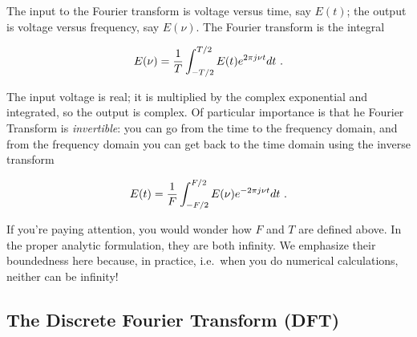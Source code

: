 \documentclass[11pt,preprint]{aastex}
\begin{document}
        The input to the Fourier transform is voltage versus time, say
$E(t)$; the output is voltage versus frequency, say $E(\nu)$.  The Fourier
transform is the integral
 
\begin{equation} \label{ift}
E(\nu) = {1 \over T} \int_{-T/2}^{T/2} E(t) e^{2 \pi j \nu t} dt \ .
\end{equation}
 
\noindent The input voltage is real; it is multiplied by the complex
exponential and integrated, so the output is complex. Of particular
importance is that he Fourier Transform is {\it invertible}: you can go
from the time to the frequency domain, and from the frequency domain you can
get back to the time domain using the inverse transform

\begin{equation}
E(t) = {1 \over F} \int_{-F/2}^{F/2} E(\nu) e^{-2 \pi j \nu t} dt \ .
\end{equation}
 
 If you're paying attention, you would wonder how
$F$ and $T$ are defined above. In the proper analytic formulation, they
are both infinity. We emphasize their boundedness here because, in
practice, i.e.\ when you do numerical calculations, neither can be
infinity!

\subsection{The Discrete Fourier Transform (DFT)} \label{dft}
\end{document}
